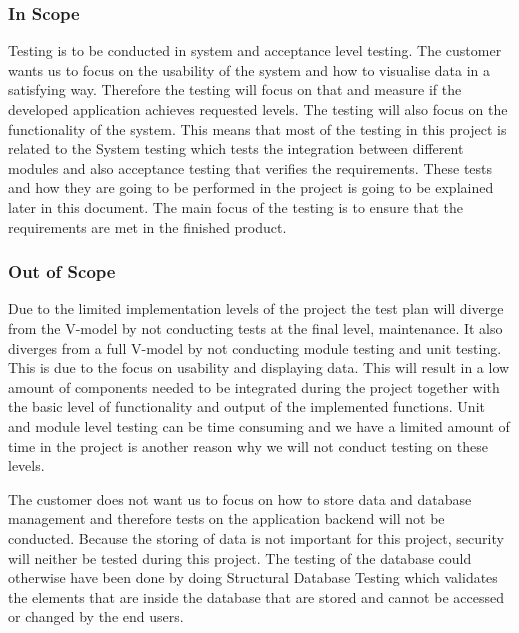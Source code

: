 \subsubsection{In Scope}
Testing is to be conducted in system and acceptance level testing. The customer wants us to focus on the usability of the system and how to visualise data in a satisfying way.  Therefore the testing will focus on that and measure if the developed application achieves requested levels. The testing will also focus on the functionality of the system. This means that most of the testing in this project is related to the System testing which tests the integration between different modules and also acceptance testing that verifies the requirements. These tests and how they are going to be performed in the project is going to be explained later in this document. The main focus of the testing is to ensure that the requirements are met in the finished product. 

\subsubsection{Out of Scope} 
Due to the limited implementation levels of the project the test plan will diverge from the V-model by not conducting tests at the final level, maintenance. It also diverges from a full V-model by not conducting module testing and unit testing. This is due to the focus on usability and displaying data. This will result in a low amount of components needed to be integrated during the project together with the basic level of functionality and output of the implemented functions. Unit and module level testing can be time consuming and we have a limited amount of time in the project is another reason why we will not conduct testing on these levels. \newline

\noindent The customer does not want us to focus on how to store data and database management and therefore tests on the application backend will not be conducted. Because the storing of data is not important  for this project, security will neither be tested during this project. The testing of the database could otherwise have been done by doing Structural Database Testing which validates the elements that are inside the database that are stored and cannot be accessed or changed by the end users. 



